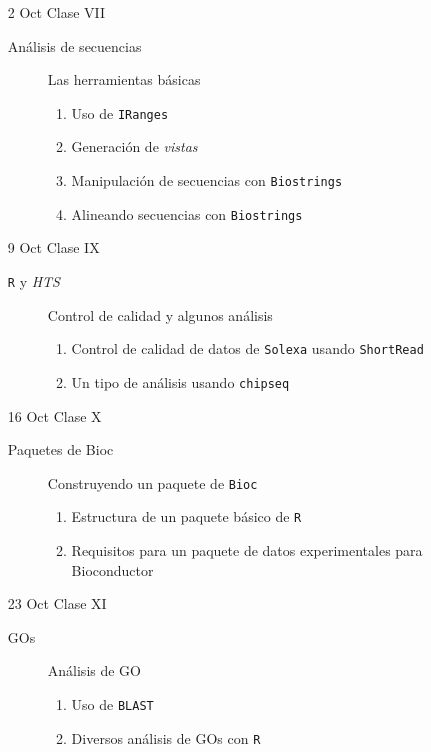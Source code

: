 \documentclass[letterpaper,12pt]{article}
\newcommand{\pl}[1]{\texttt{#1}}
\begin{document}
\begin{itemize}
  \item[2 Oct] Clase VII
  \begin{description}
  \item[Análisis de secuencias] Las herramientas básicas
  \begin{enumerate}
  \item Uso de \pl{IRanges}
  \item Generación de \emph{vistas}
  \item Manipulación de secuencias con \pl{Biostrings}
  \item Alineando secuencias con \pl{Biostrings}
  \end{enumerate}
  \end{description}
  
  \item[9 Oct] Clase IX
  \begin{description}
  \item[\pl{R} y \emph{HTS}] Control de calidad y algunos análisis
    \begin{enumerate}
      \item Control de calidad de datos de \pl{Solexa} usando \pl{ShortRead}
      \item Un tipo de análisis usando \pl{chipseq}
    \end{enumerate}
  \end{description}
  
  \item[16 Oct] Clase X
  \begin{description}
  \item[Paquetes de Bioc] Construyendo un paquete de \pl{Bioc}
  \begin{enumerate}
  \item Estructura de un paquete básico de \pl{R}
  \item Requisitos para un paquete de datos experimentales para Bioconductor
  \end{enumerate}
  \end{description}
  
  \item[23 Oct] Clase XI
  \begin{description}
  \item[GOs] Análisis de GO
  \begin{enumerate}
  \item Uso de \pl{BLAST}
  \item Diversos análisis de GOs con \pl{R}
  \end{enumerate}
  \end{description}  
  

\end{itemize}
\end{document}
